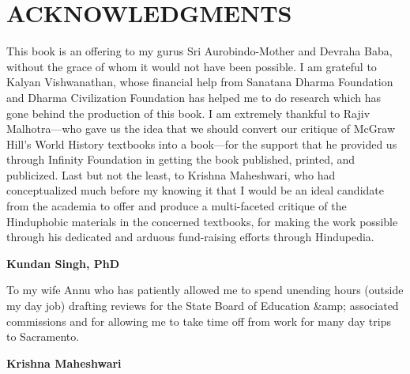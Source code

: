 \chapter{ACKNOWLEDGMENTS}


This book is an offering to my gurus Sri Aurobindo-Mother and Devraha Baba, without the grace of whom it would not have been possible. I am grateful to Kalyan Vishwanathan, whose financial help from Sanatana Dharma Foundation and Dharma Civilization Foundation has helped me to do research which has gone behind the production of this book. I am extremely thankful to Rajiv Malhotra—who gave us the idea that we should convert our critique of McGraw Hill’s World History textbooks into a book—for the support that he provided us through Infinity Foundation in getting the book published, printed, and publicized. Last but not the least, to Krishna Maheshwari, who had conceptualized much before my knowing it that I would be an ideal candidate from the academia to offer and produce a multi-faceted critique of the Hinduphobic materials in the concerned textbooks, for making the work possible through his dedicated and arduous fund-raising efforts through Hindupedia.

\begin{flushright}
\textbf{Kundan Singh, PhD}
\end{flushright}


To my wife Annu who has patiently allowed me to spend unending hours (outside my day job) drafting reviews for the State Board of Education &amp; associated commissions and for allowing me to take time off from work for many day trips to Sacramento.

\begin{flushright}
\textbf{Krishna Maheshwari}
\end{flushright}
